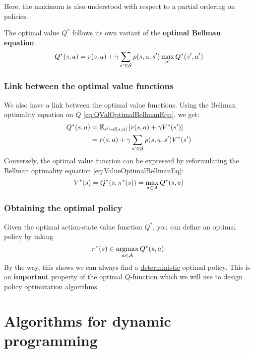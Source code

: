 \documentclass[../course-notes.tex]{subfiles}
\begin{document}
Here, the maximum is also understood with respect to a partial ordering on policies.

The optimal value $Q^*$ follows its own variant of the \textbf{\bluefont optimal Bellman equation}:
\begin{equation}\label{eq:QValOptimalBellmanEqn}
	Q^*(s,a) = r(s,a) + 
	\gamma\sum_{s'\in\mathcal{S}} p(s,a,s') \max_{a'} Q^*(s',a')
\end{equation}


\subsubsection{Link between the optimal value functions}

We also have a link between the optimal value functions. Using the Bellman optimality equation on $Q$ \eqref{eq:QValOptimalBellmanEqn}, we get:
\begin{equation}
\begin{aligned}
	Q^*(s,a) &= \operatorname{\mathbb{E}}_{s'\sim d(s,a)}\left[
	r(s,a) + \gamma V^*(s') \right]  \\
	&=
	r(s,a) + \gamma \sum_{s'\in\mathcal{S}} p(s,a,s') V^*(s')
\end{aligned}
\end{equation}
Conversely, the optimal value function can be expressed by reformulating the Bellman optimality equation \eqref{eq:ValueOptimalBellmanEq}:
\begin{equation}
	V^*(s) = Q^*(s,\pi^*(s)) =
	\max_{a\in\mathcal{A}} Q^*(s,a)
\end{equation}


\subsubsection{Obtaining the optimal policy}

Given the optimal action-state value function $Q^*$, you can define an optimal policy by taking
\begin{equation}\label{eq:QValueToOptimalPolicy}
	\pi^*(s) \in \operatorname*{\mathrm{argmax}}_{a\in\mathcal{A}} Q^*(s,a).
\end{equation}
By the way, this shows we can always find a \underline{deterministic} optimal policy. This is an \textbf{important} property of the optimal $Q$-function which we will use to design policy optimization algorithms.


\section{Algorithms for dynamic programming}
\end{document}
